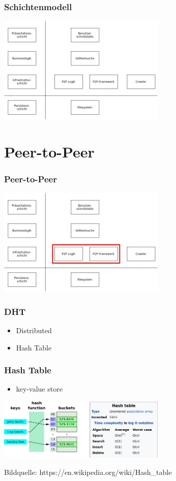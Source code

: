 \documentclass{beamer}
\begin{document}
\begin{frame}
  \frametitle{Schichtenmodell}

  \includegraphics[width=8cm]{Schichten}
\end{frame}

\section{Peer-to-Peer}
\begin{frame}
  \frametitle{Peer-to-Peer}
  \includegraphics[width=8cm]{Schichten-p2p}
\end{frame}

\begin{frame}
  \frametitle{DHT}

  \begin{itemize}
    \item Distributed
    \item Hash Table
  \end{itemize}
\end{frame}

\begin{frame}
  \frametitle{Hash Table}

  \begin{itemize}
    \item key-value store
  \end{itemize}

  \medskip

  \includegraphics[width=8cm]{ht}

  \medskip

  {\tiny Bildquelle: https://en.wikipedia.org/wiki/Hash\_table}
\end{frame}
\end{document}
